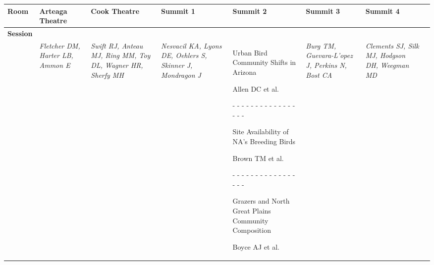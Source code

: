 \begin{tabular}{|x{0.8cm}|x{2.65cm}|x{2.65cm}|x{2.65cm}|y{2.65cm}|x{2.65cm}|x{2.65cm}|@{}m{0pt}@{}}\hline
Room & Arteaga Theatre & Cook Theatre & Summit 1 & Summit 2 & Summit 3 & Summit 4&\\
\hline
\rule{0pt}{1em} \textbf{Session} &\footnotesize \textbf{} & \footnotesize \textbf{} & \footnotesize \textbf{} & \footnotesize \textbf{} & \footnotesize \textbf{} & \footnotesize \textbf{}&\\[25ex]
\hline
{}& \par \vspace{8pt} \textit{Fletcher DM, Harter LB, Ammon E} &  \par \vspace{8pt} \textit{Swift RJ, Anteau MJ, Ring MM, Toy DL, Wagner HR, Sherfy MH} &  \par \vspace{8pt} \textit{Nesvacil KA, Lyons DE, Oehlers S, Skinner J, Mondragon J} & \scriptsize Urban Bird Community Shifts in Arizona\par \tiny Allen DC et al.\par - - - - - - - - - - - - - - - - - \par \vspace{2pt} \scriptsize Site Availability of NA's Breeding Birds\par \tiny Brown TM et al.\par - - - - - - - - - - - - - - - - - \par \vspace{2pt} \scriptsize Grazers and North Great Plains Community Composition\par \tiny Boyce AJ et al. &  \par \vspace{8pt} \textit{Burg TM, Guevara-L'{o}pez J, Perkins N, Bost CA} &  \par \vspace{8pt} \textit{Clements SJ, Silk MJ, Hodgson DH, Weegman MD}&\\[25ex]

\end{tabular}
